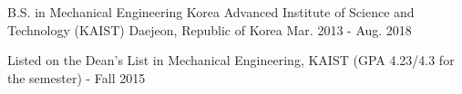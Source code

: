 \begin{cventries}
  \cventry
  {B.S. in Mechanical Engineering} %
  {Korea Advanced Institute of Science and Technology (KAIST)} %
  {Daejeon, Republic of Korea} %
  {Mar. 2013 - Aug. 2018} %
  {
    \begin{cvitems} %
      \item {Listed on the Dean’s List in Mechanical Engineering, KAIST (GPA 4.23/4.3 for the semester) - Fall 2015}
    \end{cvitems}
  }

\end{cventries}
